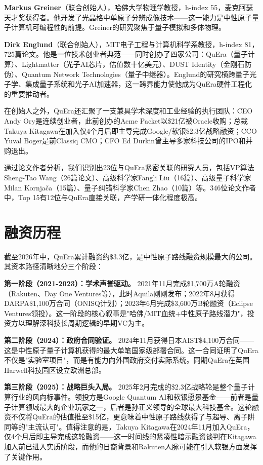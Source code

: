 \documentclass[11pt,a4paper]{ctexart}
\begin{document}
\textbf{Markus Greiner}（联合创始人），哈佛大学物理学教授，h-index 55，麦克阿瑟天才奖获得者。他开发了光晶格中单原子分辨成像技术——这一能力是中性原子量子计算机可编程性的前提。Greiner的研究聚焦于量子模拟和多体物理。

\textbf{Dirk Englund}（联合创始人），MIT电子工程与计算机科学系教授，h-index 81，725篇论文。他是一位技术创业者典范——同时创办了四家公司：QuEra（量子计算）、Lightmatter（光子AI芯片，估值数十亿美元）、DUST Identity（金刚石防伪）、Quantum Network Technologies（量子中继器）。Englund的研究横跨量子光子学、集成量子系统和光子AI加速器，这一跨界能力使他成为QuEra硬件工程化的重要推动者。

在创始人之外，QuEra还汇聚了一支兼具学术深度和工业经验的执行团队：CEO Andy Ory是连续创业者，此前创办的Acme Packet以\$21亿被Oracle收购；总裁Takuya Kitagawa在加入仅4个月后即主导完成Google/软银\$2.3亿战略融资；CCO Yuval Boger是前Classiq CMO；CFO Ed Durkin曾主导多家科技公司的IPO和并购退出。

通过论文作者分析，我们识别出23位与QuEra紧密关联的研究人员，包括VP算法Sheng-Tao Wang（26篇论文）、高级科学家Fangli Liu（16篇）、高级量子科学家Milan Kornjača（15篇）、量子纠错科学家Chen Zhao（10篇）等。346位论文作者中，Top 15有12位与QuEra直接关联，产学研一体化程度极高。

\section{融资历程}
截至2026年中，QuEra累计融资约\$3.3亿，是中性原子路线融资规模最大的公司。其资本路径清晰地分三个阶段：

\textbf{第一阶段（2021-2023）：学术声誉驱动。} 2021年11月完成\$1,700万A轮融资（Rakuten、Day One Ventures等），此时Aquila刚刚发布；2022年8月获得DARPA\$1,100万合同（ONISQ计划）；2023年6月完成\$3,600万B轮融资（Eclipse Ventures领投）。这一阶段的核心叙事是"哈佛/MIT血统+中性原子路线潜力"，投资方以理解深科技长周期逻辑的早期VC为主。

\textbf{第二阶段（2024）：政府合同验证。} 2024年11月获得日本AIST\$4,100万合同——这是中性原子量子计算机获得的最大单笔国家级部署合同。这一合同证明了QuEra不仅是"实验室项目"，而是有能力向外国政府交付实际系统。同期QuEra在英国Harwell科技园区设立欧洲总部。

\textbf{第三阶段（2025）：战略巨头入局。} 2025年2月完成的\$2.3亿战略轮是整个量子计算行业的风向标事件。领投方是Google Quantum AI和软银愿景基金——前者是量子计算领域最大的企业玩家之一，后者是孙正义领导的全球最大科技基金。这轮融资不仅将QuEra的估值推至\$15亿，更意味着中性原子路线获得了与超导、离子阱同等的"主流认可"。值得注意的是，Takuya Kitagawa在2024年11月加入QuEra，仅4个月后即主导完成这轮融资——这一时间线的紧凑性暗示融资谈判在Kitagawa加入前已进入实质阶段，而他的日裔背景和Rakuten人脉可能在引入软银方面发挥了关键作用。
\end{document}
